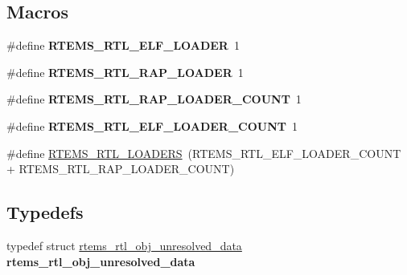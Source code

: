 \subsection*{Macros}
\begin{DoxyCompactItemize}
\item 
\mbox{\label{rtl-obj_8c_a338058825c5ba0e3bdb426080c25bc5f}} 
\#define {\bfseries R\+T\+E\+M\+S\+\_\+\+R\+T\+L\+\_\+\+E\+L\+F\+\_\+\+L\+O\+A\+D\+ER}~1
\item 
\mbox{\label{rtl-obj_8c_a0c16965867556afc5e0351bf2fe294dd}} 
\#define {\bfseries R\+T\+E\+M\+S\+\_\+\+R\+T\+L\+\_\+\+R\+A\+P\+\_\+\+L\+O\+A\+D\+ER}~1
\item 
\mbox{\label{rtl-obj_8c_a5a69055d2bcee6e6d0f0ce8fe7b0e7a3}} 
\#define {\bfseries R\+T\+E\+M\+S\+\_\+\+R\+T\+L\+\_\+\+R\+A\+P\+\_\+\+L\+O\+A\+D\+E\+R\+\_\+\+C\+O\+U\+NT}~1
\item 
\mbox{\label{rtl-obj_8c_a0acdf26b7981e2a0c8de93f0b2f62d60}} 
\#define {\bfseries R\+T\+E\+M\+S\+\_\+\+R\+T\+L\+\_\+\+E\+L\+F\+\_\+\+L\+O\+A\+D\+E\+R\+\_\+\+C\+O\+U\+NT}~1
\item 
\#define \mbox{\hyperlink{rtl-obj_8c_a3e57f4e8e49945981608f26243b642c7}{R\+T\+E\+M\+S\+\_\+\+R\+T\+L\+\_\+\+L\+O\+A\+D\+E\+RS}}~(R\+T\+E\+M\+S\+\_\+\+R\+T\+L\+\_\+\+E\+L\+F\+\_\+\+L\+O\+A\+D\+E\+R\+\_\+\+C\+O\+U\+NT + R\+T\+E\+M\+S\+\_\+\+R\+T\+L\+\_\+\+R\+A\+P\+\_\+\+L\+O\+A\+D\+E\+R\+\_\+\+C\+O\+U\+NT)
\end{DoxyCompactItemize}
\subsection*{Typedefs}
\begin{DoxyCompactItemize}
\item 
\mbox{\label{rtl-obj_8c_a5b9b6d9e78ba222ef045ec8d2d365ee6}} 
typedef struct \mbox{\hyperlink{structrtems__rtl__obj__unresolved__data}{rtems\+\_\+rtl\+\_\+obj\+\_\+unresolved\+\_\+data}} {\bfseries rtems\+\_\+rtl\+\_\+obj\+\_\+unresolved\+\_\+data}
\end{DoxyCompactItemize}
